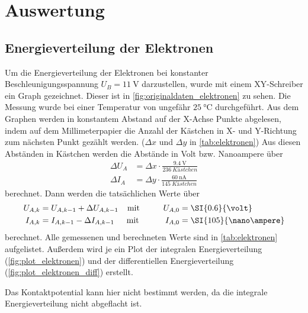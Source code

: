 \section{Auswertung}
\label{sec:Auswertung}

\subsection{Energieverteilung der Elektronen}
\label{ssec:auswwertung_elektronen}

Um die Energieverteilung der Elektronen bei konstanter Beschleunigungsspannung $U_B=\SI{11}{\volt}$ darzustellen, wurde mit einem XY-Schreiber ein Graph gezeichnet. 
Dieser ist in \autoref{fig:originaldaten_elektronen} zu sehen.
Die Messung wurde bei einer Temperatur von ungefähr $\SI{25}{\celsius}$ durchgeführt.
Aus dem Graphen werden in konstantem Abstand auf der X-Achse Punkte abgelesen, indem auf dem Millimeterpapier die Anzahl der Kästchen in X- und Y-Richtung zum nächsten Punkt gezählt werden. ($\Delta x$ und $\Delta y$ in \autoref{tab:elektronen})
Aus diesen Abständen in Kästchen werden die Abstände in Volt bzw. Nanoampere über
\begin{align}
    \Delta U_A &= \Delta x \cdot \frac{\SI{9.4}{\volt}}{\SI{236}{Kästchen}} \\
    \Delta I_A &= \Delta y \cdot \frac{\SI{60}{\nano\ampere}}{\SI{145}{Kästchen}}
\end{align}
berechnet.
Dann werden die tatsächlichen Werte über
\begin{align}
    U_{A,k} &= U_{A,k-1} + \Delta U_{A,k-1} &\text{mit\hspace{1cm}} U_{A,0} &= \SI{0.6}{\volt} \\
    I_{A,k} &= I_{A,k-1} - \Delta I_{A,k-1} &\text{mit \hspace{1cm}} I_{A,0} &= \SI{105}{\nano\ampere}
\end{align}
berechnet.
Alle gemessenen und berechneten Werte sind in \autoref{tab:elektronen} aufgelistet.
Außerdem wird je ein Plot der integralen Energieverteilung (\autoref{fig:plot_elektronen}) und der differentiellen Energieverteilung (\autoref{fig:plot_elektronen_diff}) erstellt.

Das Kontaktpotential kann hier nicht bestimmt werden, da die integrale Energieverteilung nicht abgeflacht ist.


